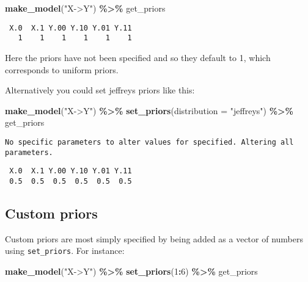 \documentclass[
  12pt,
]{book}
\newenvironment{Shaded}{\begin{snugshade}}{\end{snugshade}}
\newcommand{\AttributeTok}[1]{\textcolor[rgb]{0.13,0.29,0.53}{#1}}
\newcommand{\DecValTok}[1]{\textcolor[rgb]{0.00,0.00,0.81}{#1}}
\newcommand{\FunctionTok}[1]{\textcolor[rgb]{0.13,0.29,0.53}{\textbf{#1}}}
\newcommand{\NormalTok}[1]{#1}
\newcommand{\SpecialCharTok}[1]{\textcolor[rgb]{0.81,0.36,0.00}{\textbf{#1}}}
\newcommand{\StringTok}[1]{\textcolor[rgb]{0.31,0.60,0.02}{#1}}
\begin{document}
\begin{Shaded}
\begin{Highlighting}[]
\FunctionTok{make\_model}\NormalTok{(}\StringTok{"X{-}\textgreater{}Y"}\NormalTok{) }\SpecialCharTok{\%\textgreater{}\%}\NormalTok{ get\_priors}
\end{Highlighting}
\end{Shaded}

\begin{verbatim}
 X.0  X.1 Y.00 Y.10 Y.01 Y.11 
   1    1    1    1    1    1 
\end{verbatim}

Here the priors have not been specified and so they default to 1, which corresponds to uniform priors.

Alternatively you could set jeffreys priors like this:

\begin{Shaded}
\begin{Highlighting}[]
\FunctionTok{make\_model}\NormalTok{(}\StringTok{"X{-}\textgreater{}Y"}\NormalTok{) }\SpecialCharTok{\%\textgreater{}\%} \FunctionTok{set\_priors}\NormalTok{(}\AttributeTok{distribution =} \StringTok{"jeffreys"}\NormalTok{) }\SpecialCharTok{\%\textgreater{}\%}\NormalTok{ get\_priors}
\end{Highlighting}
\end{Shaded}

\begin{verbatim}
No specific parameters to alter values for specified. Altering all parameters.
\end{verbatim}

\begin{verbatim}
 X.0  X.1 Y.00 Y.10 Y.01 Y.11 
 0.5  0.5  0.5  0.5  0.5  0.5 
\end{verbatim}

\hypertarget{custom-priors}{%
\subsection{Custom priors}\label{custom-priors}}

Custom priors are most simply specified by being added as a vector of numbers using \texttt{set\_priors}. For instance:

\begin{Shaded}
\begin{Highlighting}[]
\FunctionTok{make\_model}\NormalTok{(}\StringTok{"X{-}\textgreater{}Y"}\NormalTok{) }\SpecialCharTok{\%\textgreater{}\%} \FunctionTok{set\_priors}\NormalTok{(}\DecValTok{1}\SpecialCharTok{:}\DecValTok{6}\NormalTok{) }\SpecialCharTok{\%\textgreater{}\%}\NormalTok{ get\_priors}
\end{Highlighting}
\end{Shaded}
\end{document}
